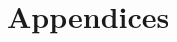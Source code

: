\documentclass[a4paper,11pt]{article}
\begin{document}
\clearpage
\begin{spacing}{1}
  
  
\end{spacing}

\clearpage
\appendix
\section*{Appendices}
\renewcommand{\thesubsection}{\Alph{subsection}}


\clearpage

\clearpage

\end{document}
